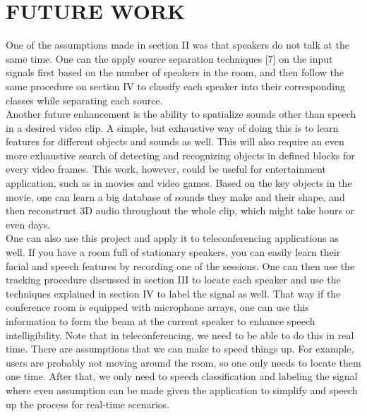 \documentclass{article}
\begin{document}
\section{FUTURE WORK}
One of the assumptions made in section II was that speakers do not talk at the same time. One can the apply source separation techniques [7] on the input signals first based on the number of speakers in the room, and then follow the same procedure on section IV to classify each speaker into their corresponding classes while separating each source. \\

Another future enhancement is the ability to spatialize sounds other than speech in a desired video clip. A simple, but exhaustive way of doing this is to learn features for different objects and sounds as well. This will also require an even more exhaustive search of detecting and recognizing objects in defined blocks for every video frames. This work, however, could be useful for entertainment application, such as in movies and video games. Based on the key objects in the movie, one can learn a big database of sounds they make and their shape, and then reconstruct 3D audio throughout the whole clip, which might take hours or even days. \\

One can also use this project and apply it to teleconferencing applications as well. If you have a room full of stationary speakers, you can easily learn their facial and speech features by recording one of the sessions. One can then use the tracking procedure discussed in section III to locate each speaker and use the techniques explained in section IV to label the signal as well. That way if the conference room is equipped with microphone arrays, one can use this information to form the beam at the current speaker to enhance speech intelligibility. Note that in teleconferencing, we need to be able to do this in real time. There are assumptions that we can make to speed things up. For example, users are probably not moving around the room, so one only needs to locate them one time. After that, we only need to speech classification and labeling the signal where even assumption can be made given the application to simplify and speech up the process for real-time scenarios. \\ 
\end{document}
